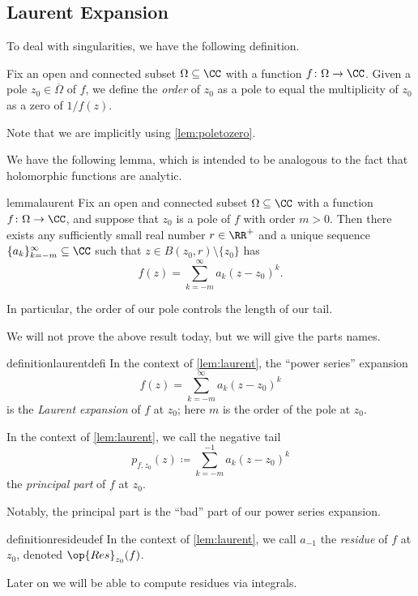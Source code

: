 \documentclass[../notes.tex]{subfiles}
\begin{document}
\subsection{Laurent Expansion}
To deal with singularities, we have the following definition.
\begin{definition}[Order]
	Fix an open and connected subset $\Omega\subseteq\CC$ with a function $f\colon \Omega\to\CC$. Given a pole $z_0\in\overline\Omega$ of $f$, we define the \textit{order} of $z_0$ as a pole to equal the multiplicity of $z_0$ as a zero of $1/f(z)$.
\end{definition}
Note that we are implicitly using \autoref{lem:poletozero}.

We have the following lemma, which is intended to be analogous to the fact that holomorphic functions are analytic.
\begin{restatable}{lemma}{laurent} \label{lem:laurent}
	Fix an open and connected subset $\Omega\subseteq\CC$ with a function $f\colon \Omega\to\CC$, and suppose that $z_0$ is a pole of $f$ with order $m>0$. Then there exists any sufficiently small real number $r\in\RR^+$ and a unique sequence $\{a_k\}_{k=-m}^\infty\subseteq\CC$ such that $z\in B(z_0,r)\setminus\{z_0\}$ has
	\[f(z)=\sum_{k=-m}^\infty a_k(z-z_0)^k.\]
\end{restatable}
\noindent In particular, the order of our pole controls the length of our tail.

We will not prove the above result today, but we will give the parts names.
\begin{restatable}{definition}{laurentdefi}
	In the context of \autoref{lem:laurent}, the ``power series'' expansion
	\[f(z)=\sum_{k=-m}^\infty a_k(z-z_0)^k\]
	is the \textit{Laurent expansion} of $f$ at $z_0$; here $m$ is the order of the pole at $z_0$.
\end{restatable}
\begin{definition}
	In the context of \autoref{lem:laurent}, we call the negative tail
	\[p_{f,z_0}(z)\coloneqq \sum_{k=-m}^{-1}a_k(z-z_0)^k\]
	the \textit{principal part} of $f$ at $z_0$.
\end{definition}
Notably, the principal part is the ``bad'' part of our power series expansion.
\begin{restatable}[Residue]{definition}{resideudef}
	In the context of \autoref{lem:laurent}, we call $a_{-1}$ the \textit{residue} of $f$ at $z_0$, denoted $\op{Res}_{z_0}(f)$.
\end{restatable}
\noindent Later on we will be able to compute residues via integrals.
\end{document}
